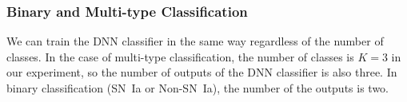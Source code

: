 \documentclass[useamsfonts]{pasj01}
\begin{document}



\subsubsection{Binary and Multi-type Classification}
We can train the DNN classifier in the same way regardless of the number of classes.
In the case of multi-type classification, the number of classes is $K = 3$ in our experiment, so the number of outputs of the DNN classifier is also three.
In binary classification (SN~Ia or Non-SN~Ia), the number of the outputs is two.
\end{document}
